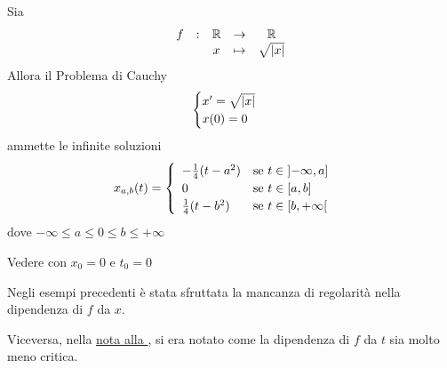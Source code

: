 \begin{example}
	Sia
	\[\begin{array}{ccccc} {f} & : & {\mathbb{R}} & \to & {\mathbb{R}} \\ & & {x} & \mapsto & {\sqrt{\left|x\right|}} \\ \end{array}\]
	Allora il Problema di Cauchy
	\begin{equation*}
		\begin{cases}
			x' = \sqrt{\left|x\right|}\\
			x(0) = 0
		\end{cases}
	\end{equation*}
	ammette le infinite soluzioni
	\begin{equation*}
		x_{a,b}(t) =
		\begin{cases}
			\begin{array}{ll}
				-\frac{1}{4}(t-a^2) & \text{se } t \in \left]-\infty,a\right]\\
				0 & \text{se } t \in \left[a,b\right]\\
				\frac{1}{4}(t-b^2) & \text{se } t \in \left[b,+\infty\right[
			\end{array}
		\end{cases}
	\end{equation*}
	dove $-\infty \leq a \leq 0 \leq b \leq +\infty$
	\begin{solution}
		Vedere  con $x_0 = 0$ e $t_0 = 0$
	\end{solution}
\end{example}
\begin{observation}
	Negli esempi precedenti è stata sfruttata la mancanza di regolarità nella dipendenza di $f$ da $x$.

	Viceversa, nella \hyperlink{note:volterra_non_cont}{nota alla }, si era notato come la dipendenza di $f$ da $t$ sia molto meno critica.
\end{observation}
